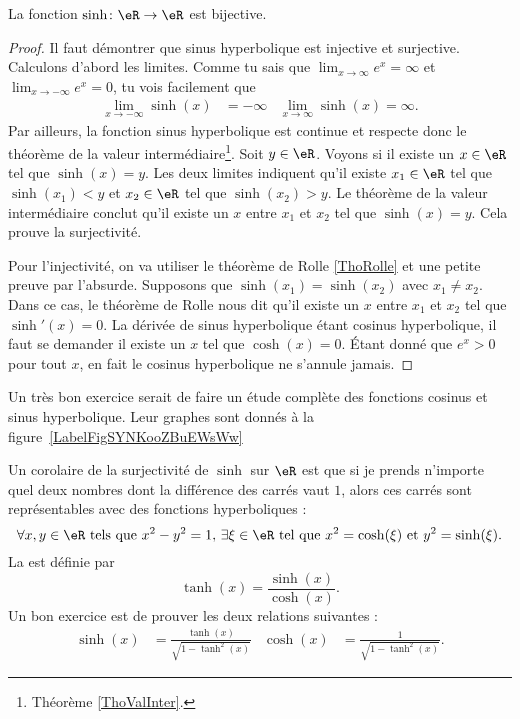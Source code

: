 \begin{proposition}
	La fonction \( \sinh\colon \eR\to\eR \) est bijective.
\end{proposition}

\begin{proof}
	Il faut démontrer que sinus hyperbolique est injective et surjective. Calculons d'abord les limites. Comme tu sais que \( \lim_{x\to\infty} e^{x}=\infty\) et \( \lim_{x\to-\infty} e^{x}=0\), tu vois facilement que
	\begin{align}
		\lim_{x\to-\infty}\sinh(x) & =-\infty & \lim_{x\to\infty}\sinh(x)=\infty.
	\end{align}
	Par ailleurs, la fonction sinus hyperbolique est continue et respecte donc le théorème de la valeur intermédiaire\footnote{Théorème \ref{ThoValInter}.}. Soit \( y\in\eR\). Voyons si il existe un \( x\in\eR\) tel que \( \sinh(x)=y\). Les deux limites indiquent qu'il existe \( x_1\in\eR\) tel que \( \sinh(x_1)<y\) et \( x_2\in\eR\) tel que \( \sinh(x_2)>y\). Le théorème de la valeur intermédiaire conclut qu'il existe un \( x\) entre \( x_1\) et \( x_2\) tel que \( \sinh(x)=y\). Cela prouve la surjectivité.

	Pour l'injectivité, on va utiliser le théorème de Rolle \ref{ThoRolle} et une petite preuve par l'absurde. Supposons que \( \sinh(x_1)=\sinh(x_2)\) avec \( x_1\neq x_2\). Dans ce cas, le théorème de Rolle nous dit qu'il existe un \( x\) entre \( x_1\) et \( x_2\) tel que \( \sinh'(x)=0\). La dérivée de sinus hyperbolique étant cosinus hyperbolique, il faut se demander il existe un \( x\) tel que \( \cosh(x)=0\). Étant donné que \(  e^{x}>0\) pour tout \( x\), en fait le cosinus hyperbolique ne s'annule jamais.
\end{proof}

\newcommand{\CaptionFigSYNKooZBuEWsWw}{En rouge, la fonction \( x\mapsto \sinh(x)\) et en bleu, la fonction \( x\mapsto\cosh(x)\).}


Un très bon exercice serait de faire un étude complète des fonctions cosinus et sinus hyperbolique. Leur graphes sont donnés à la figure~\ref{LabelFigSYNKooZBuEWsWw}

Un corolaire de la surjectivité de \( \sinh\) sur \( \eR\) est que si je prends n'importe quel deux nombres dont la différence des carrés vaut \( 1\), alors ces carrés sont représentables avec des fonctions hyperboliques :
\[
	\forall x,y\in\eR \text{ tels que } x^2-y^2=1,\,\exists\xi\in\eR \text{ tel que } x^2=\cosh(\xi)\text{ et }y^2=\sinh(\xi).
\]
La  est définie par
\begin{equation}
	\tanh(x)=\frac{ \sinh(x) }{ \cosh(x) }.
\end{equation}
Un bon exercice est de prouver les deux relations suivantes :
\begin{align}		\label{EqRelSinhthcosh}
	\sinh(x) & =\frac{ \tanh(x) }{ \sqrt{1-\tanh^2(x)} } & \cosh(x) & =\frac{1}{ \sqrt{1-\tanh^2(x)} }.
\end{align}

